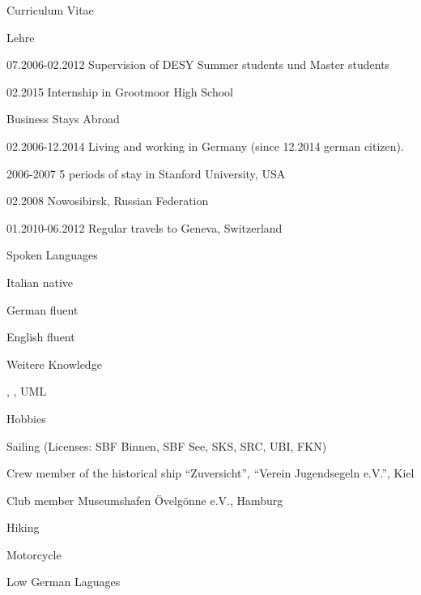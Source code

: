 \documentclass[11pt,a4paper]{scrartcl}
\newcommand{\versal}[1]{\textsf{\textsmaller{\MakeUppercase{\caps{#1}}}}\xspace}
\newcommand*{\ac}[1]{\versal{#1}}
\begin{document}
\begin{cv}{Curriculum Vitae}
\begin{cvlist}{Lehre}
\item [07.2006-02.2012] Supervision of DESY Summer students und
Master students
\item [02.2015] Internship in Grootmoor High School
\end{cvlist}

\begin{cvlist}{Business Stays Abroad}
\item [02.2006-12.2014] Living and working in Germany (since 12.2014 german
citizen).
\item [2006-2007] 5 periods of stay in Stanford University, USA
\item [02.2008] Nowosibirsk, Russian Federation
\item [01.2010-06.2012] Regular travels to Geneva, Switzerland
\end{cvlist}

\begin{cvlist}{Spoken Languages}
\item [Italian] native
\item [German] fluent
\item [English] fluent
\end{cvlist}

\begin{cvlist}{Weitere \ac{EDV} Knowledge}
\item[] \ac{MS OFFICE}, \ac{\LaTeX}, UML
\end{cvlist}


\begin{cvlist}{Hobbies}
\item Sailing (Licenses: SBF Binnen, SBF See, SKS, SRC, UBI, FKN)
\item Crew member of the historical ship "`Zuversicht"', "`Verein
Jugendsegeln e.V."', Kiel
\item Club member Museumshafen \"Ovelg\"onne e.V., Hamburg
\item Hiking
\item Motorcycle
\item Low German Laguages
\end{cvlist}


\end{cv}
\end{document}

